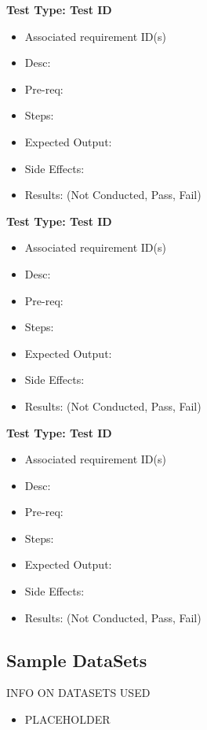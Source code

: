 \smallskip\textbf{Test Type: Test ID}
\begin{itemize}
    \item Associated requirement ID(s)
    \item Desc: 
    \item Pre-req: 
    \item Steps: 
    \item Expected Output: 
    \item Side Effects: 
    \item Results: (Not Conducted, Pass, Fail)
\end{itemize}

\smallskip\textbf{Test Type: Test ID}
\begin{itemize}
    \item Associated requirement ID(s)
    \item Desc: 
    \item Pre-req: 
    \item Steps: 
    \item Expected Output: 
    \item Side Effects: 
    \item Results: (Not Conducted, Pass, Fail)
\end{itemize}

\smallskip\textbf{Test Type: Test ID}
\begin{itemize}
    \item Associated requirement ID(s)
    \item Desc: 
    \item Pre-req: 
    \item Steps: 
    \item Expected Output: 
    \item Side Effects: 
    \item Results: (Not Conducted, Pass, Fail)
\end{itemize}

\subsection*{Sample DataSets}

INFO ON DATASETS USED
\begin{itemize}
    \item PLACEHOLDER
  \end{itemize}

